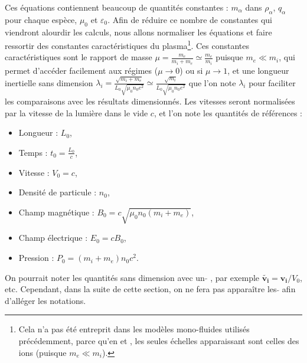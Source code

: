  Ces équations contiennent beaucoup de quantités constantes : $m_{\alpha}$ dans $\rho_{\alpha}$, $q_{\alpha}$ pour chaque espèce, $ \mu_0$ et $\varepsilon_0$. Afin de réduire ce nombre de constantes qui viendront alourdir les calculs,  nous allons normaliser les équations et faire ressortir des constantes caractéristiques du plasma\footnote{Cela n'a pas été entreprit dans les modèles mono-fluides utilisés précédemment, parce qu'en  et , les seules échelles apparaissant sont celles des ions (puisque $m_e \ll m_i$).}. 
Ces constantes caractéristiques sont le rapport de masse $\mu = \frac{m_e}{m_i+m_e} \simeq \frac{m_e}{m_i}$ puisque $m_e \ll m_i$, qui permet d'accéder facilement aux régimes  ($\mu \rightarrow 0$) ou  si $\mu \rightarrow 1$, et une longueur inertielle sans dimension $\lambda_i = \frac{\sqrt{m_i+m_e}}{L_0 \sqrt{\mu_0 n_0 e^2}} \simeq \frac{\sqrt{m_i}}{L_0 \sqrt{\mu_0 n_0 e^2}}$ que l'on note $\lambda_i$ pour faciliter les comparaisons avec les résultats dimensionnés. Les vitesses seront normalisées par la vitesse de la lumière dans le vide $c$, et l'on note les quantités de références :
\begin{itemize}
    \item Longueur : $L_0$,
    \item Temps : $t_0 = \frac{L_0}{c}$,
    \item Vitesse : $V_0 = c$,
    \item Densité de particule : $n_0$,
    \item Champ magnétique : $B_0 = c \sqrt{\mu_0 n_0 (m_i+m_e)}$,
    \item Champ électrique : $E_0 = c B_0$,
    \item Pression : $P_0 = (m_i+m_e)n_0 c^2$.
\end{itemize}
On pourrait noter les quantités sans dimension avec un \og $\tilde{}$ \fg{}, par exemple $\tilde{\boldsymbol{v_i}} = \boldsymbol{v_i}/V_0$, etc. Cependant, dans la suite de cette section, on ne fera pas apparaître les \og $\tilde{}$ \fg{} afin d'alléger les notations.

